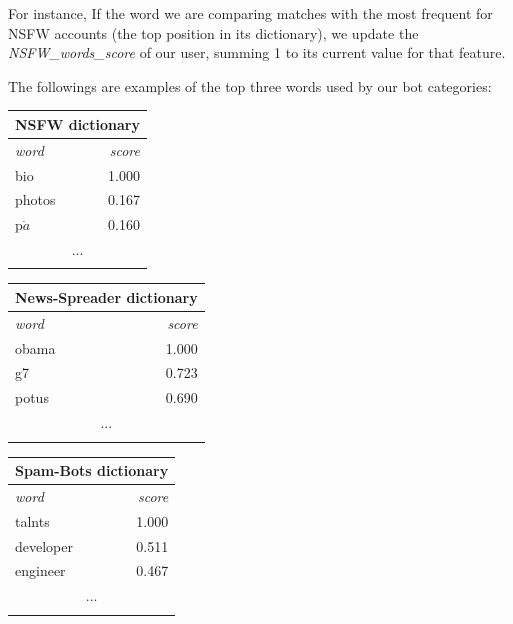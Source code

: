 For instance, If the word we are comparing matches with the most frequent for NSFW accounts (the top position in its dictionary), we update the \textit{NSFW\_words\_score} of our user, summing 1 to its current value for that feature.

The followings are examples of the top three words used by our bot categories:
\small
\begin{center}
	\begin{tabular}{lllll}
		\multicolumn{5}{c}{\textbf{NSFW dictionary}} \\
		\hline\hline
		\multicolumn{4}{l}{\textit{word}} & 
		\multicolumn{1}{r}{\textit{score}}\\
		\hline\hline
		\multicolumn{4}{l}{bio} & 
		\multicolumn{1}{r}{1.000}\\
		\multicolumn{4}{l}{photos} & 
		\multicolumn{1}{r}{0.167}\\
		\multicolumn{4}{l}{p$ \dot{a} $} & 
		\multicolumn{1}{r}{0.160}\\
		\multicolumn{5}{c}{...} \\
		\hline\\
	\end{tabular}
\end{center}
\normalsize
\small
\begin{center}
	\begin{tabular}{lllll}
		\multicolumn{5}{c}{\textbf{News-Spreader dictionary}} \\
		\hline\hline
		\multicolumn{4}{l}{\textit{word}} & 
		\multicolumn{1}{r}{\textit{score}}\\
		\hline\hline
		\multicolumn{4}{l}{obama} & 
		\multicolumn{1}{r}{1.000}\\
		\multicolumn{4}{l}{g7} & 
		\multicolumn{1}{r}{0.723}\\
		\multicolumn{4}{l}{potus} & 
		\multicolumn{1}{r}{0.690}\\
		\multicolumn{5}{c}{...} \\
		\hline\\
	\end{tabular}
\end{center}
\normalsize
\small
\begin{center}
	\begin{tabular}{lllll}
		\multicolumn{5}{c}{\textbf{Spam-Bots dictionary}} \\
		\hline\hline
		\multicolumn{4}{l}{\textit{word}} & 
		\multicolumn{1}{r}{\textit{score}}\\
		\hline\hline
		\multicolumn{4}{l}{talnts} & 
		\multicolumn{1}{r}{1.000}\\
		\multicolumn{4}{l}{developer} & 
		\multicolumn{1}{r}{0.511}\\
		\multicolumn{4}{l}{engineer} & 
		\multicolumn{1}{r}{0.467}\\
		\multicolumn{5}{c}{...} \\
		\hline\\
	\end{tabular}
\end{center}
